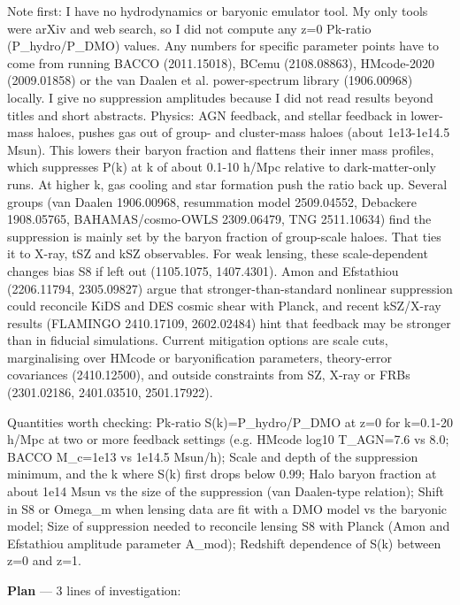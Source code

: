 \documentclass[11pt,a4paper]{article}
\begin{document}
Note first: I have no hydrodynamics or baryonic emulator tool. My only tools were arXiv and web search, so I did not compute any z=0 Pk-ratio (P\_hydro/P\_DMO) values. Any numbers for specific parameter points have to come from running BACCO (2011.15018), BCemu (2108.08863), HMcode-2020 (2009.01858) or the van Daalen et al. power-spectrum library (1906.00968) locally. I give no suppression amplitudes because I did not read results beyond titles and short abstracts. Physics: AGN feedback, and stellar feedback in lower-mass haloes, pushes gas out of group- and cluster-mass haloes (about 1e13-1e14.5 Msun). This lowers their baryon fraction and flattens their inner mass profiles, which suppresses P(k) at k of about 0.1-10 h/Mpc relative to dark-matter-only runs. At higher k, gas cooling and star formation push the ratio back up. Several groups (van Daalen 1906.00968, resummation model 2509.04552, Debackere 1908.05765, BAHAMAS/cosmo-OWLS 2309.06479, TNG 2511.10634) find the suppression is mainly set by the baryon fraction of group-scale haloes. That ties it to X-ray, tSZ and kSZ observables. For weak lensing, these scale-dependent changes bias S8 if left out (1105.1075, 1407.4301). Amon and Efstathiou (2206.11794, 2305.09827) argue that stronger-than-standard nonlinear suppression could reconcile KiDS and DES cosmic shear with Planck, and recent kSZ/X-ray results (FLAMINGO 2410.17109, 2602.02484) hint that feedback may be stronger than in fiducial simulations. Current mitigation options are scale cuts, marginalising over HMcode or baryonification parameters, theory-error covariances (2410.12500), and outside constraints from SZ, X-ray or FRBs (2301.02186, 2401.03510, 2501.17922).

Quantities worth checking: Pk-ratio S(k)=P\_hydro/P\_DMO at z=0 for k=0.1-20 h/Mpc at two or more feedback settings (e.g. HMcode log10 T\_AGN=7.6 vs 8.0; BACCO M\_c=1e13 vs 1e14.5 Msun/h); Scale and depth of the suppression minimum, and the k where S(k) first drops below 0.99; Halo baryon fraction at about 1e14 Msun vs the size of the suppression (van Daalen-type relation); Shift in S8 or Omega\_m when lensing data are fit with a DMO model vs the baryonic model; Size of suppression needed to reconcile lensing S8 with Planck (Amon and Efstathiou amplitude parameter A\_mod); Redshift dependence of S(k) between z=0 and z=1.

\textbf{Plan} --- 3 lines of investigation:
\end{document}
